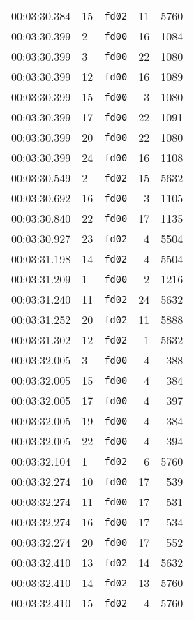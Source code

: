 \documentclass{article}
\begin{document}
\begin{longtable}{lllrr}
00:03:30.384 & 15 & \texttt{fd02} & 11 & 5760 \\
00:03:30.399 & 2 & \texttt{fd00} & 16 & 1084 \\
00:03:30.399 & 3 & \texttt{fd00} & 22 & 1080 \\
00:03:30.399 & 12 & \texttt{fd00} & 16 & 1089 \\
00:03:30.399 & 15 & \texttt{fd00} & 3 & 1080 \\
00:03:30.399 & 17 & \texttt{fd00} & 22 & 1091 \\
00:03:30.399 & 20 & \texttt{fd00} & 22 & 1080 \\
00:03:30.399 & 24 & \texttt{fd00} & 16 & 1108 \\
00:03:30.549 & 2 & \texttt{fd02} & 15 & 5632 \\
00:03:30.692 & 16 & \texttt{fd00} & 3 & 1105 \\
00:03:30.840 & 22 & \texttt{fd00} & 17 & 1135 \\
00:03:30.927 & 23 & \texttt{fd02} & 4 & 5504 \\
00:03:31.198 & 14 & \texttt{fd02} & 4 & 5504 \\
00:03:31.209 & 1 & \texttt{fd00} & 2 & 1216 \\
00:03:31.240 & 11 & \texttt{fd02} & 24 & 5632 \\
00:03:31.252 & 20 & \texttt{fd02} & 11 & 5888 \\
00:03:31.302 & 12 & \texttt{fd02} & 1 & 5632 \\
00:03:32.005 & 3 & \texttt{fd00} & 4 & 388 \\
00:03:32.005 & 15 & \texttt{fd00} & 4 & 384 \\
00:03:32.005 & 17 & \texttt{fd00} & 4 & 397 \\
00:03:32.005 & 19 & \texttt{fd00} & 4 & 384 \\
00:03:32.005 & 22 & \texttt{fd00} & 4 & 394 \\
00:03:32.104 & 1 & \texttt{fd02} & 6 & 5760 \\
00:03:32.274 & 10 & \texttt{fd00} & 17 & 539 \\
00:03:32.274 & 11 & \texttt{fd00} & 17 & 531 \\
00:03:32.274 & 16 & \texttt{fd00} & 17 & 534 \\
00:03:32.274 & 20 & \texttt{fd00} & 17 & 552 \\
00:03:32.410 & 13 & \texttt{fd02} & 14 & 5632 \\
00:03:32.410 & 14 & \texttt{fd02} & 13 & 5760 \\
00:03:32.410 & 15 & \texttt{fd02} & 4 & 5760 \\

\end{longtable}
\end{document}
